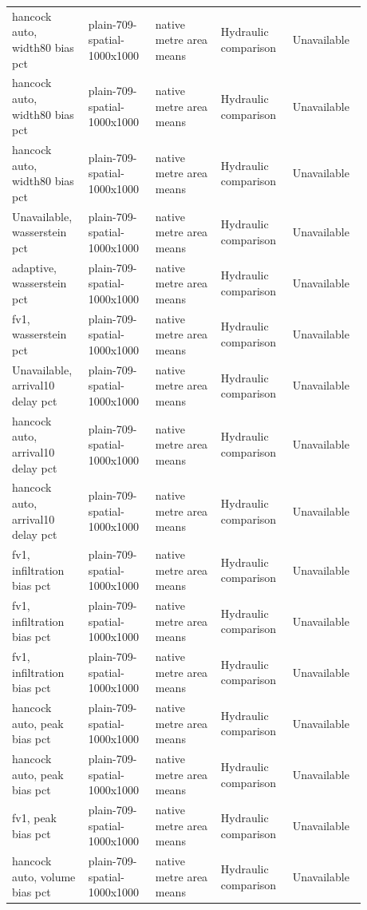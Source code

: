 \begin{longtable}{p{0.1760\linewidth}p{0.1760\linewidth}p{0.1760\linewidth}p{0.1760\linewidth}p{0.1760\linewidth}}
hancock auto, width80 bias pct & plain-709-spatial-1000x1000 & native metre area means & Hydraulic comparison & Unavailable \\
hancock auto, width80 bias pct & plain-709-spatial-1000x1000 & native metre area means & Hydraulic comparison & Unavailable \\
hancock auto, width80 bias pct & plain-709-spatial-1000x1000 & native metre area means & Hydraulic comparison & Unavailable \\
Unavailable, wasserstein pct & plain-709-spatial-1000x1000 & native metre area means & Hydraulic comparison & Unavailable \\
adaptive, wasserstein pct & plain-709-spatial-1000x1000 & native metre area means & Hydraulic comparison & Unavailable \\
fv1, wasserstein pct & plain-709-spatial-1000x1000 & native metre area means & Hydraulic comparison & Unavailable \\
Unavailable, arrival10 delay pct & plain-709-spatial-1000x1000 & native metre area means & Hydraulic comparison & Unavailable \\
hancock auto, arrival10 delay pct & plain-709-spatial-1000x1000 & native metre area means & Hydraulic comparison & Unavailable \\
hancock auto, arrival10 delay pct & plain-709-spatial-1000x1000 & native metre area means & Hydraulic comparison & Unavailable \\
fv1, infiltration bias pct & plain-709-spatial-1000x1000 & native metre area means & Hydraulic comparison & Unavailable \\
fv1, infiltration bias pct & plain-709-spatial-1000x1000 & native metre area means & Hydraulic comparison & Unavailable \\
fv1, infiltration bias pct & plain-709-spatial-1000x1000 & native metre area means & Hydraulic comparison & Unavailable \\
hancock auto, peak bias pct & plain-709-spatial-1000x1000 & native metre area means & Hydraulic comparison & Unavailable \\
hancock auto, peak bias pct & plain-709-spatial-1000x1000 & native metre area means & Hydraulic comparison & Unavailable \\
fv1, peak bias pct & plain-709-spatial-1000x1000 & native metre area means & Hydraulic comparison & Unavailable \\
hancock auto, volume bias pct & plain-709-spatial-1000x1000 & native metre area means & Hydraulic comparison & Unavailable \\

\end{longtable}
